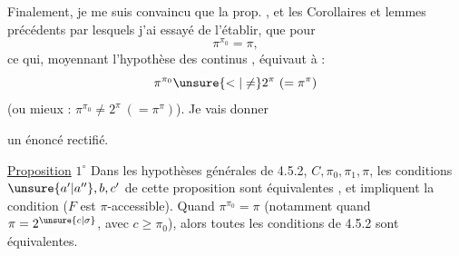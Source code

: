 Finalement, je me suis convaincu que la prop. , et les Corollaires et lemmes précédents par lesquels j'ai essayé de l'établir,  que pour   
\[
\pi^{\pi_0}=\pi,
\]
ce qui, moyennant l'hypothèse des continus , équivaut à :
\[
\pi^{\pi_0}\unsure{<|\neq}2^\pi\ (=\pi^\pi)
\]
(ou mieux : $\pi^{\pi_0}\neq2^\pi\ (=\pi^\pi)$). Je vais donner

 un énoncé rectifié.

\uline{Proposition}  \textcircled{$1^\circ$} Dans les hypothèses générales de 4.5.2,  $C,\pi_0,\pi_1,\pi$, les conditions $\unsure{a'|a''},b,c'$ de  cette proposition sont équivalentes , et impliquent la condition ($F$ est $\pi$-accessible). Quand $\pi^{\pi_0}=\pi$ (notamment quand $\pi=2^{\unsure{c|\sigma}}$, avec $c\geq\pi_0$), alors toutes les conditions  de 4.5.2 sont équivalentes.


